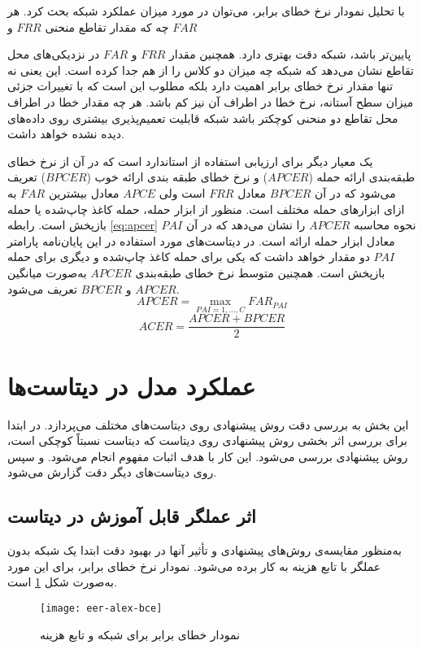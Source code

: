 با تحلیل نمودار نرخ خطای برابر، می‌توان در مورد میزان عملکرد شبکه بحث کرد. هر چه که مقدار تقاطع منحنی $FRR$ و
$FAR$

پایین‌تر باشد، شبکه دقت بهتری دارد. همچنین مقدار
 $FRR$ و $FAR$
در نزدیکی‌های محل تقاطع نشان می‌دهد که شبکه چه میزان دو کلاس را از هم جدا کرده است. این یعنی نه تنها مقدار نرخ خطای برابر اهمیت دارد بلکه مطلوب این است که با تغییرات جزئی میزان سطح آستانه، نرخ خطا در اطراف آن نیز کم باشد. هر چه مقدار خطا در اطراف محل تقاطع دو منحنی کوچکتر باشد شبکه قابلیت تعمیم‌پذیری بیشتری روی داده‌های دیده نشده خواهد داشت.

یک معیار دیگر برای ارزیابی استفاده از استاندارد
است که در آن از نرخ خطای طبقه‌بندی ارائه حمله
  ($APCER$) 
و نرخ خطای طبقه بندی ارائه خوب
 ($BPCER$) 
تعریف می‌شود که در آن
$BPCER$
 معادل
$FRR$ 
است ولی
$APCE$
معادل بیشترین
$FAR$ 
به ازای ابزارهای حمله مختلف است.
منظور از ابزار حمله، حمله کاغذ چاپ‌شده یا حمله بازپخش است. رابطه 
\ref{eq:apcer}
نحوه محاسبه 
$APCER$
را نشان می‌دهد که در آن 
$PAI$
معادل ابزار حمله ارائه
است. در دیتاست‌های مورد استفاده در این پایان‌نامه پارامتر 
$PAI$
دو مقدار خواهد داشت که یکی برای حمله کاغذ چاپ‌شده و دیگری برای حمله بازپخش است.
همچنین متوسط نرخ خطای طبقه‌بندی 
 $APCER$
به‌صورت میانگین 
$APCER$
 و 
$BPCER$ 
تعریف می‌شود.
\begin{equation}\label{eq:apcer}
	APCER=\max_{PAI=1,...,C}{FAR_{PAI}}
\end{equation}
\begin{equation}\label{eq:ACER}
	ACER=\frac{APCER+BPCER}{2}
\end{equation}
\section{عملکرد مدل در دیتاست‌ها}
این بخش به بررسی دقت روش پیشنهادی روی دیتاست‌های مختلف می‌پردازد. در ابتدا برای بررسی اثر بخشی روش پیشنهادی روی دیتاست  که دیتاست نسبتاً کوچکی است، روش پیشنهادی بررسی می‌شود. این کار با هدف اثبات مفهوم
 انجام می‌شود. و سپس روی دیتاست‌های دیگر دقت گزارش می‌شود.
\subsection{اثر عملگر  قابل آموزش در دیتاست }
به‌منظور مقایسه‌ی روش‌های پیشنهادی و تأثیر آنها در بهبود دقت ابتدا یک شبکه  بدون عملگر  با تابع هزینه  به کار برده می‌شود. نمودار نرخ خطای برابر، برای این مورد به‌صورت شکل 
\ref{fig:eer-alex-bce} 
است. 
\begin{figure}[h]
	\centerline{\texttt{[image: eer-alex-bce]}}
	\caption{نمودار خطای برابر برای شبکه  و تابع هزینه }
	\label{fig:eer-alex-bce}
\end{figure}

